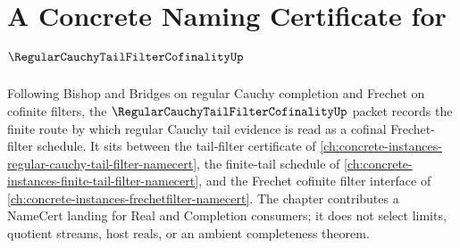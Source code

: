 \chapter{A Concrete Naming Certificate for $\RegularCauchyTailFilterCofinalityUp$}
\label{ch:concrete-instances-regular-cauchy-tail-filter-cofinality-namecert}

Following Bishop and Bridges on regular Cauchy completion and Frechet on cofinite filters, the $\RegularCauchyTailFilterCofinalityUp$ packet records the finite route by which regular Cauchy tail evidence is read as a cofinal Frechet-filter schedule. It sits between the tail-filter certificate of \autoref{ch:concrete-instances-regular-cauchy-tail-filter-namecert}, the finite-tail schedule of \autoref{ch:concrete-instances-finite-tail-filter-namecert}, and the Frechet cofinite filter interface of \autoref{ch:concrete-instances-frechetfilter-namecert}. The chapter contributes a NameCert landing for Real and Completion consumers; it does not select limits, quotient streams, host reals, or an ambient completeness theorem.

